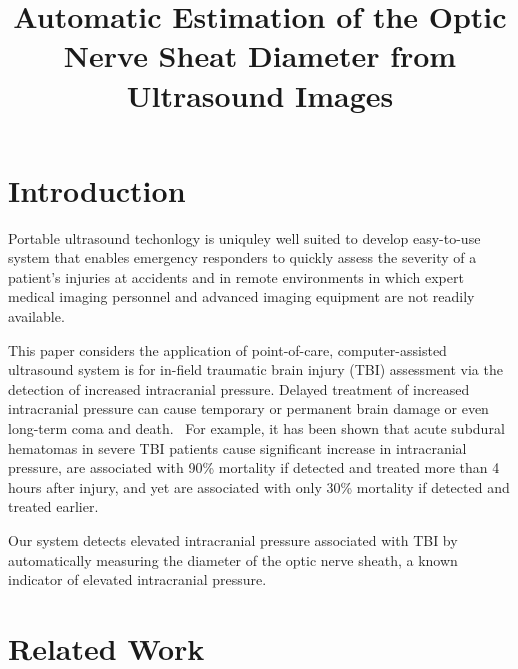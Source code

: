 \documentclass{llncs}
\begin{document}
\title{Automatic Estimation of the Optic Nerve Sheat Diameter from Ultrasound Images}
%
%
\author{}

%
\authorrunning{} %
%
\tocauthor{}
%

\maketitle              %

\begin{abstract}
\end{abstract}
%
\section{Introduction}
Portable ultrasound techonlogy is uniquley well suited to develop easy-to-use
system that enables emergency responders to quickly assess the severity of a
patient's injuries at accidents and in remote environments in which expert
medical imaging personnel and advanced imaging equipment are not readily
available.

This paper considers the application of point-of-care, computer-assisted
ultrasound system is for in-field traumatic brain injury (TBI) assessment via
the detection of increased intracranial pressure. Delayed treatment of
increased intracranial pressure can cause temporary or permanent brain damage
or even long-term coma and death.  For example, it has been shown that acute
subdural hematomas in severe TBI patients cause significant increase in
intracranial pressure, are associated with 90\% mortality if detected and
treated more than 4 hours after injury, and yet are associated with only 30\%
mortality if detected and treated earlier.

Our system detects elevated intracranial pressure associated with TBI by
automatically measuring the diameter of the optic nerve sheath, a known
indicator of elevated intracranial pressure.  

\section{Related Work}
\end{document}
